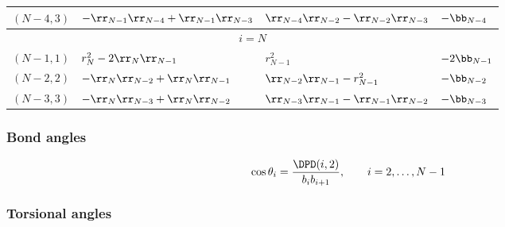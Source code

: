 \begin{table}[ht]
\begin{tabular}{|p{2cm}|p{4cm}|p{4cm}|p{2.5cm}|}
    \hline
    $(N-4,3)$		& $-\rr_{N-1}\rr_{N-4}+\rr_{N-1}\rr_{N-3}$ 
    			& $\rr_{N-4}\rr_{N-2}-\rr_{N-2}\rr_{N-3}$
			& $-\bb_{N-4}$	\\
\hline
\multicolumn{4}{|c|}{$i=N$} \\ 
\hline
$(N-1,1)$ 	& $r_{N}^2-2\rr_{N}\rr_{N-1}$	
    		& $r_{N-1}^2$ 
		& $-2\bb_{N-1}$\\
\hline
$(N-2,2)$ 	& $-\rr_N\rr_{N-2}+\rr_N\rr_{N-1}$ 
    		& $\rr_{N-2}\rr_{N-1}-r_{N-1}^2$ 
		& $-\bb_{N-2}$\\
\hline
$(N-3,3)$	& $-\rr_N\rr_{N-3}+\rr_N\rr_{N-2}$ 
    		& $\rr_{N-3}\rr_{N-1}-\rr_{N-1}\rr_{N-2}$
		& $-\bb_{N-3}$	\\
\hline
  \end{tabular}
\end{table}

\subsubsection{Bond angles}

\begin{equation}
  \cos\theta_i=\frac{\DPD(i,2)}{b_ib_{i+1}},\qquad i=2,\ldots,N-1  
  \label{bln-bangle}
\end{equation}

\subsubsection{Torsional angles}

